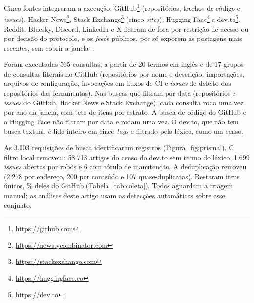 \documentclass[sigconf]{acmart}
\newcommand{\ColConsultas}{565}          %
\newcommand{\ColRequisicoes}{3.003}      %
\newcommand{\ColGruposLiterais}{17}      %
\newcommand{\ColFiltroTermo}{58.713}     %
\newcommand{\ColFiltroRobo}{1.699}       %
\newcommand{\ColFiltroRotulo}{6}         %
\newcommand{\ColDupUrl}{2.278}           %
\newcommand{\ColDupConteudo}{200}        %
\newcommand{\ColDupQuase}{107}           %
\begin{document}
Cinco fontes integraram a execução: GitHub\footnote{\url{https://github.com}} (repositórios, trechos de código e \textit{issues}), Hacker News\footnote{\url{https://news.ycombinator.com}}, Stack Exchange\footnote{\url{https://stackexchange.com}} (cinco \textit{sites}), Hugging Face\footnote{\url{https://huggingface.co}} e dev.to\footnote{\url{https://dev.to}}. Reddit, Bluesky, Discord, LinkedIn e X ficaram de fora por restrição de acesso ou por decisão do protocolo, e os \textit{feeds} públicos, por só exporem as postagens mais recentes, sem cobrir a janela~\cite{msrkit2027}.

Foram executadas \ColConsultas{} consultas, a partir de 20 termos em inglês e de \ColGruposLiterais{} grupos de consultas literais no GitHub (repositórios por nome e descrição, importações, arquivos de configuração, invocações em fluxos de CI e \textit{issues} de defeito dos repositórios das ferramentas). Nas buscas que filtram por data (repositórios e \textit{issues} do GitHub, Hacker News e Stack Exchange), cada consulta roda uma vez por ano da janela, com teto de \ResPerQueryLimit{} itens por estrato. A busca de código do GitHub e o Hugging Face não filtram por data e rodam uma vez. O dev.to, que não tem busca textual, é lido inteiro em cinco \textit{tags} e filtrado pelo léxico, como um censo.

As \ColRequisicoes{} requisições de busca identificaram \ResPrismaIdentificados{} registros (Figura~\ref{fig:prisma}). O filtro local removeu \ResPrismaFiltrados: \ColFiltroTermo{} artigos do censo do dev.to sem termo do léxico, \ColFiltroRobo{} \textit{issues} abertas por robôs e \ColFiltroRotulo{} com rótulo de manutenção. A deduplicação removeu \ResPrismaDuplicatas{} (\ColDupUrl{} por endereço, \ColDupConteudo{} por conteúdo e \ColDupQuase{} quase-duplicatas). Restaram \ResItens{} itens únicos, \ResPctGithub\% deles do GitHub (Tabela~\ref{tab:coleta}). Todos aguardam a triagem manual; as análises deste artigo usam as detecções automáticas sobre esse conjunto.
\end{document}
